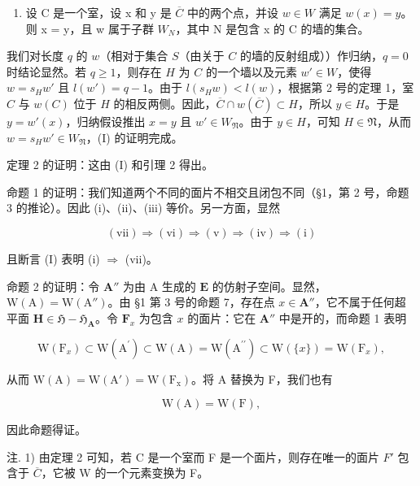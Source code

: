 \begin{enumerate}
\def\labelenumi{(\Roman{enumi})}
\tightlist
\item
设 C 是一个室，设 x 和 y 是 \(\overline{C}\) 中的两个点，并设 \(w \in W\) 满足 \(w(x) = y\)。则 x = y，且 w 属于子群 \(W_{N}\)，其中 N 是包含 x 的 C 的墙的集合。
\end{enumerate}

我们对长度 \(q\) 的 \(w\)（相对于集合 \(S\)（由关于 \(C\) 的墙的反射组成））作归纳，\(q = 0\) 时结论显然。若 \(q \geqslant 1\)，则存在 \(H\) 为 \(C\) 的一个墙以及元素 \(w' \in W\)，使得 \(w = s_H w'\) 且 \(l(w') = q - 1\)。由于 \(l(s_H w) < l(w)\)，根据第 2 号的定理 1，室 \(C\) 与 \(w(C)\) 位于 \(H\) 的相反两侧。因此，\(\overline{C} \cap w(\overline{C}) \subset H\)，所以 \(y \in H\)。于是 \(y = w'(x)\)，归纳假设推出 \(x = y\) 且 \(w' \in W_{\mathfrak{N}}\)。由于 \(y \in H\)，可知 \(H \in \mathfrak{N}\)，从而 \(w = s_H w' \in W_{\mathfrak{N}}\)，(I) 的证明完成。

定理 2 的证明：这由 (I) 和引理 2 得出。

命题 1 的证明：我们知道两个不同的面片不相交且闭包不同（§1，第 2 号，命题 3 的推论）。因此 (i)、(ii)、(iii) 等价。另一方面，显然

\[
(\mathrm{vii}) \Longrightarrow (\mathrm{vi}) \Longrightarrow (\mathrm{v}) \Longrightarrow (\mathrm{iv}) \Longrightarrow (\mathrm{i})
\]

且断言 (I) 表明 (i) \(\Longrightarrow\) (vii)。

命题 2 的证明：令 \(\mathbf{A}''\) 为由 A 生成的 \(\mathbf{E}\) 的仿射子空间。显然，\(\mathrm{W(A)} = \mathrm{W(A'')}\)。由 §1 第 3 号的命题 7，存在点 \(x \in \mathbf{A}''\)，它不属于任何超平面 \(\mathbf{H} \in \mathfrak{H} - \mathfrak{H}_{\mathbf{A}}\)。令 \(\mathbf{F}_x\) 为包含 \(x\) 的面片：它在 \(\mathbf{A}''\) 中是开的，而命题 1 表明

\[
\mathrm{W} \left(\mathrm{F} _ {x}\right) \subset \mathrm{W} \left(\mathrm{A} ^ {\prime}\right) \subset \mathrm{W} (\mathrm{A}) = \mathrm{W} \left(\mathrm{A} ^ {\prime \prime}\right) \subset \mathrm{W} (\{x \}) = \mathrm{W} \left(\mathrm{F} _ {x}\right),
\]

从而 \(\mathrm{W(A) = W(A') = W(F_x)}\)。将 A 替换为 F，我们也有

\[
\mathrm{W} (\mathrm{A}) = \mathrm{W} (\mathrm{F}),
\]

因此命题得证。

注. 1) 由定理 2 可知，若 C 是一个室而 F 是一个面片，则存在唯一的面片 \(F'\) 包含于 \(\overline{C}\)，它被 W 的一个元素变换为 F。

